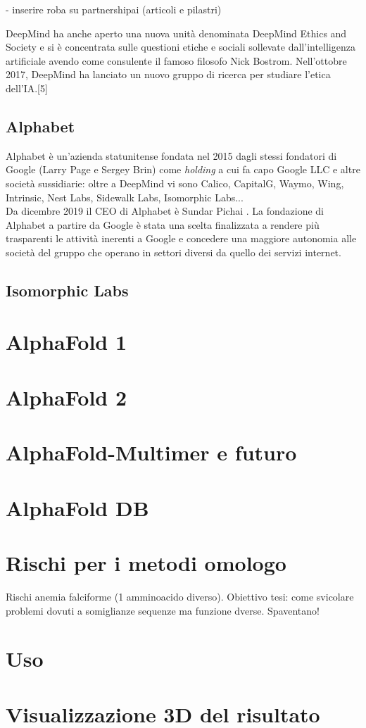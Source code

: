 - inserire roba su partnershipai (articoli e pilastri)
 
DeepMind ha anche aperto una nuova unità denominata DeepMind Ethics and Society e si è concentrata sulle questioni etiche e sociali sollevate dall'intelligenza artificiale avendo come consulente il famoso filosofo Nick Bostrom. Nell'ottobre 2017, DeepMind ha lanciato un nuovo gruppo di ricerca per studiare l'etica dell'IA.[5]

\subsection{Alphabet}
Alphabet è un'azienda statunitense fondata nel 2015 dagli stessi fondatori di Google (Larry Page e Sergey Brin) come \textit{holding} a cui fa capo Google LLC e altre società sussidiarie: oltre a DeepMind vi sono Calico, CapitalG, Waymo, Wing, Intrinsic, Nest Labs, Sidewalk Labs, Isomorphic Labs...\\ 
Da dicembre 2019 il CEO di Alphabet è Sundar Pichai \cite{cnbc}.
La fondazione di Alphabet a partire da Google è stata una scelta finalizzata a rendere più trasparenti le attività inerenti a Google e concedere una maggiore autonomia alle società del gruppo che operano in settori diversi da quello dei servizi internet.

\subsection{Isomorphic Labs}


 
\section{AlphaFold 1}
\section{AlphaFold 2}
\section{AlphaFold-Multimer e futuro}
\section{AlphaFold DB}



\section{Rischi per i metodi omologo}
Rischi anemia falciforme (1 amminoacido diverso).
Obiettivo tesi: come svicolare problemi dovuti a somiglianze sequenze ma funzione dverse. Spaventano! 
\section{Uso}
\section{Visualizzazione 3D del risultato}

\clearpage